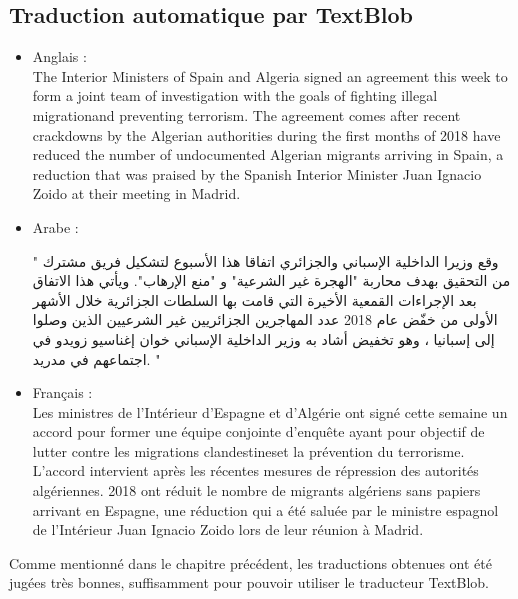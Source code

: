 \subsection{Traduction automatique par TextBlob}
\begin{itemize}
    \item Anglais :\\ 
    \textquotedbl The Interior Ministers of Spain and Algeria signed an agreement this week to form a joint team of investigation with the goals of fighting \textquotedbl illegal migration\textquotedbl and \textquotedbl preventing terrorism\textquotedbl. The agreement comes after recent crackdowns by the Algerian authorities during the first months of 2018 have reduced the number of undocumented Algerian migrants arriving in Spain, a reduction that was praised by the Spanish Interior Minister Juan Ignacio Zoido at their meeting in Madrid.\textquotedbl \\
    
    \item Arabe :\\
    \begin{arab}" وقع وزيرا الداخلية الإسباني والجزائري اتفاقا هذا الأسبوع لتشكيل فريق مشترك من التحقيق بهدف محاربة "الهجرة غير الشرعية" و "منع الإرهاب". ويأتي هذا الاتفاق بعد الإجراءات القمعية الأخيرة التي قامت بها السلطات الجزائرية خلال الأشهر الأولى من خفّض عام 2018 عدد المهاجرين الجزائريين غير الشرعيين الذين وصلوا إلى إسبانيا ، وهو تخفيض أشاد به وزير الداخلية الإسباني خوان إغناسيو زويدو في اجتماعهم في مدريد. "\end{arab}
    
    \item Français :\\
    \textquotedbl Les ministres de l'Intérieur d'Espagne et d'Algérie ont signé cette semaine un accord pour former une équipe conjointe d'enquête ayant pour objectif de lutter contre les \textquotedbl migrations clandestines\textquotedbl et \textquotedbl la prévention du terrorisme\textquotedbl. L'accord intervient après les récentes mesures de répression des autorités algériennes. 2018 ont réduit le nombre de migrants algériens sans papiers arrivant en Espagne, une réduction qui a été saluée par le ministre espagnol de l'Intérieur Juan Ignacio Zoido lors de leur réunion à Madrid.\textquotedbl \\
\end{itemize}

Comme mentionné dans le chapitre précédent, les traductions obtenues ont été jugées très bonnes, suffisamment pour pouvoir utiliser le traducteur TextBlob.

